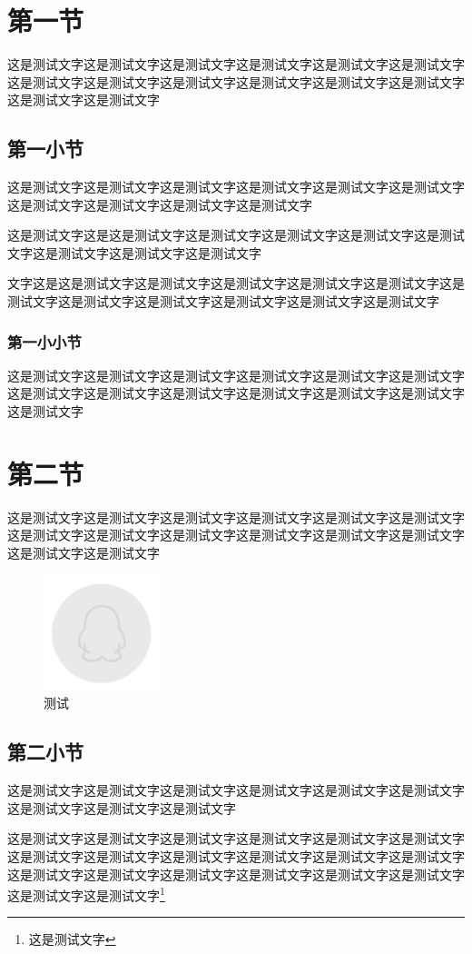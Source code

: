 \documentclass[UTF8]{ctexart}
\begin{document}
\tableofcontents\thispagestyle{empty}
\newpage
\setcounter{page}{1}
\section{第一节}
这是测试文字这是测试文字这是测试文字这是测试文字这是测试文字这是测试文字这是测试文字这是测试文字这是测试文字这是测试文字这是测试文字这是测试文字这是测试文字这是测试文字
\subsection{第一小节}
这是测试文字这是测试文字这是测试文字这是测试文字这是测试文字这是测试文字这是测试文字这是测试文字这是测试文字这是测试文字
\par 这是测试文字这是这是测试文字这是测试文字这是测试文字这是测试文字这是测试文字这是测试文字这是测试文字这是测试文字
\par 文字这是这是测试文字这是测试文字这是测试文字这是测试文字这是测试文字这是测试文字这是测试文字这是测试文字这是测试文字这是测试文字这是测试文字
\subsubsection{第一小小节}
这是测试文字这是测试文字这是测试文字这是测试文字这是测试文字这是测试文字这是测试文字这是测试文字这是测试文字这是测试文字这是测试文字这是测试文字这是测试文字
\section{第二节}
这是测试文字这是测试文字这是测试文字这是测试文字这是测试文字这是测试文字这是测试文字这是测试文字这是测试文字这是测试文字这是测试文字这是测试文字这是测试文字这是测试文字
\begin{figure}[htbp]
	\centering
	\includegraphics [width=0.3\textwidth]{test.jpg}
	\caption{测试}
\end{figure}
\subsection{第二小节}
\par 这是测试文字这是测试文字这是测试文字这是测试文字这是测试文字这是测试文字这是测试文字这是测试文字这是测试文字
\par 这是测试文字这是测试文字这是测试文字这是测试文字这是测试文字这是测试文字这是测试文字这是测试文字这是测试文字这是测试文字这是测试文字这是测试文字这是测试文字这是测试文字这是测试文字这是测试文字这是测试文字这是测试文字这是测试文字这是测试文字\footnote{这是测试文字}
\end{document}
